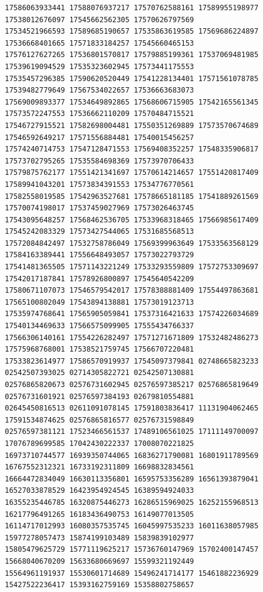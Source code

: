 \documentclass[10pt]{article}
\begin{document}
\begin{verbatim}
17586063933441 17588076937217 17570762588161 17589955198977 17538012676097 17545662562305 17570626797569
17534521966593 17589685190657 17535863619585 17569686224897 17536668401665 17571833184257 17545660465153
17576127627265 17536801570817 17579885199361 17537069481985 17539619094529 17535323602945 17573441175553
17535457296385 17590620520449 17541228134401 17571561078785 17539482779649 17567534022657 17536663683073
17569009893377 17534649892865 17568606715905 17542165561345 17573572247553 17536662110209 17570484715521
17546727915521 17582698004481 17550351269889 17573570674689 17546592649217 17571556884481 17540015456257
17574240714753 17547128471553 17569408352257 17548335906817 17573702795265 17535584698369 17573970706433
17579875762177 17551421341697 17570614214657 17551420817409 17589941043201 17573834391553 17534776770561
17582558019585 17542963527681 17578665181185 17541889261569 17570074198017 17537459027969 17573026463745
17543095648257 17568462536705 17533968318465 17566985617409 17545242083329 17573427544065 17531685568513
17572084842497 17532758786049 17569399963649 17533563568129 17584163389441 17556648493057 17573022793729
17541481365505 17571143221249 17533293559809 17572753309697 17542017187841 17578926800897 17545640542209
17580671107073 17546579542017 17578388881409 17554497863681 17565100802049 17543894138881 17573019123713
17535974768641 17565905059841 17537316421633 17574226034689 17540134469633 17566575099905 17555434766337
17566306140161 17554226282497 17571271671809 17532482486273 17575968768001 17538521759745 17566707220481
17533823614977 17586570919937 17545097379841 02748665823233 02542507393025 02714305822721 02542507130881
02576865820673 02576731602945 02576597385217 02576865819649 02576731601921 02576597384193 02679810554881
02645450816513 02611091078145 17591803836417 11131904062465 17591534874625 02576865816577 02576731598849
02576597381121 17523466561537 17489106561025 17111149700097 17076789699585 17042430222337 17008070221825
16973710744577 16939350744065 16836271790081 16801911789569 16767552312321 16733192311809 16698832834561
16664472834049 16630113356801 16595753356289 16561393879041 16527033878529 16423954924545 16389594924033
16355235446785 16320875446273 16286515969025 16252155968513 16217796491265 16183436490753 16149077013505
16114717012993 16080357535745 16045997535233 16011638057985 15977278057473 15874199103489 15839839102977
15805479625729 15771119625217 15736760147969 15702400147457 15668040670209 15633680669697 15599321192449
15564961191937 15530601714689 15496241714177 15461882236929 15427522236417 15393162759169 15358802758657

\end{verbatim}
\end{document}
